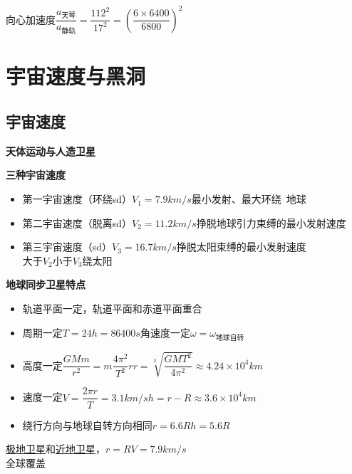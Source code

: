 向心加速度\quad $\dfrac{a_{\text{天琴}}}{a_{\text{静轨}}}=\dfrac{112^2}{17^2}=\left(\dfrac{6\times6400}{6800}\right)^2$ %


\section{宇宙速度与黑洞}
\subsection{宇宙速度}
\textbf{天体运动与人造卫星}

\textbf{三种宇宙速度}
\begin{itemize}
  \item 第一宇宙速度（环绕sd）\quad $V_1=7.9\unit{km/s}$\quad 最小发射、最大环绕\ 地球
  \item 第二宇宙速度（脱离sd）\quad $V_2=11.2\unit{km/s}$\quad 挣脱地球引力束缚的最小发射速度
  \item 第三宇宙速度（sd）\quad $V_3=16.7\unit{km/s}$\quad 挣脱太阳束缚的最小发射速度\\ 大于$V_2$小于$V_3$绕太阳
\end{itemize}

\textbf{地球同步卫星特点}
\begin{itemize}
  \item 轨道平面一定，轨道平面和赤道平面重合
  \item 周期一定\quad $T=24\unit{h}=86400\unit{s}$\quad 角速度一定\quad $\omega=\omega_{\text{地球自转}}$
  \item 高度一定\quad $\dfrac{GMm}{r^2}=m\dfrac{4\pi^2}{T^2}r$\quad $r=\sqrt[3]{\dfrac{GMT^2}{4\pi^2}}\approx4.24\times10^4\unit{km}$
  \item 速度一定\quad $V=\dfrac{2\pi r}{T}=3.1\unit{km/s}$\quad $h=r-R\approx3.6\times10^4\unit{km}$
  \item 绕行方向与地球自转方向相同\quad $r=6.6R$\quad $h=5.6R$
\end{itemize}

\underline{极地卫星}和\underline{近地卫星}，\quad $r=R$\quad $V=7.9\unit{km/s}$\\
全球覆盖 %


